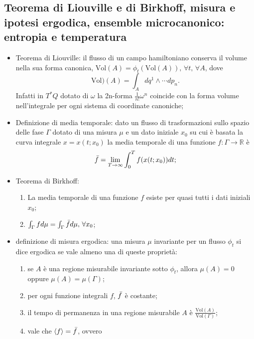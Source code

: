 \documentclass{article}
\theoremstyle{remark}
\begin{document}
\subsection{Teorema di Liouville e di Birkhoff, misura e ipotesi ergodica, ensemble microcanonico: entropia e temperatura}
\begin{itemize}
    \item Teorema di Liouville: il flusso di un campo hamiltoniano conserva il volume nella sua forma canonica, $\text{Vol}(A)=\phi_t({\text{Vol}(A)}),\,\forall t,\,\forall A$, dove
    \begin{equation}
        \text{Vol})(A)=\int_{A}dq^1\wedge\cdots dp_n.
    \end{equation}
    Infatti in $T^*Q$ dotato di $\omega$ la 2n-forma $\frac{1}{n!}\omega^n$ coincide con la forma volume nell'integrale per ogni sistema di coordinate canoniche;
    \item Definizione di media temporale: dato un flusso di trasformazioni sullo spazio delle fase $\Gamma$ dotato di una misura $\mu$ e un dato iniziale $x_0$ su cui è basata la curva integrale $x=x(t;x_0)$ la media temporale di una funzione $f:\Gamma\to\mathbb{R}$ è
    \begin{equation}
        \Bar{f}=\lim_{T\to\infty}\int_0^Tf(x(t;x_0))dt;
    \end{equation}
    \item Teorema di Birkhoff:
    \begin{enumerate}
        \item La media temporale di una funzione $f$ esiste per quasi tutti i dati iniziali $x_0$;
        \item $\int_{\Gamma}fd\mu=\int_{\Gamma}\Bar{f}d\mu,\,\forall x_0$;
    \end{enumerate}
    \item definizione di misura ergodica: una misura $\mu$ invariante per un flusso $\phi_t$ si dice ergodica se vale almeno una di queste proprietà:
    \begin{enumerate}
        \item se $A$ è una regione misurabile invariante sotto $\phi_t$, allora $\mu(A)=0$ oppure $\mu(A)=\mu(\Gamma)$;
        \item per ogni funzione integrali $f$, $\Bar{f}$ è costante;
        \item il tempo di permanenza in una regione misurabile $A$ è $\frac{\text{Vol}(A)}{\text{Vol}(\Gamma)}$;
        \item vale che $\langle f\rangle=\Bar{f}$, ovvero

\end{enumerate}
\end{itemize}
\end{document}
